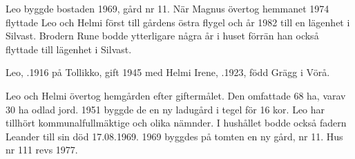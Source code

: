 Leo byggde bostaden 1969, gård nr 11. När Magnus övertog hemmanet 1974 flyttade Leo och Helmi först till gårdens östra flygel och år 1982 till en lägenhet i Silvast. Brodern Rune bodde ytterligare några år i huset förrän han också flyttade till lägenhet i Silvast.






Leo, .1916 på Tollikko, gift 1945 med Helmi Irene, .1923, född Grägg i Vörå.
\begin{jhchildren}
  \item {}
  \item {}
  \item {}
  \item {}
  \item {}
\end{jhchildren}
Leo och Helmi övertog hemgården efter giftermålet. Den omfattade 68 ha, varav 30 ha odlad jord. 1951 byggde de en ny ladugård i tegel för 16 kor. Leo har tillhört kommunalfullmäktige och olika nämnder. I hushållet bodde också fadern Leander till sin död 17.08.1969. 1969 byggdes på tomten en ny gård, nr 11. Hus nr 111 revs 1977.



